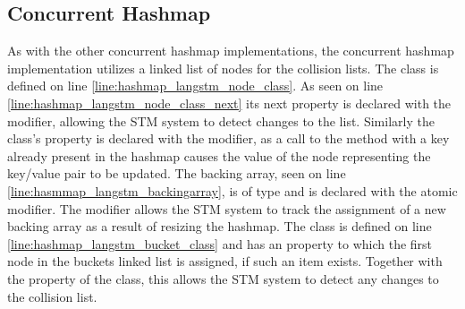 \subsection{Concurrent Hashmap}
As with the other concurrent hashmap implementations, the \stmname concurrent hashmap implementation utilizes a linked list of nodes for the collision lists. The  class is defined on line \ref{line:hashmap_langstm_node_class}. As seen on line \ref{line:hashmap_langstm_node_class_next} its next property is declared with the  modifier, allowing the \ac{STM} system to detect changes to the list. Similarly the  class's  property is declared with the  modifier, as a call to the  method with a key already present in the hashmap causes the value of the node representing the key/value pair to be updated. The backing array, seen on line \ref{line:hasmmap_langstm_backingarray}, is of type  and is declared with the atomic modifier. The  modifier allows the \ac{STM} system to track the assignment of a new backing array as a result of resizing the hashmap. The  class is defined on line \ref{line:hashmap_langstm_bucket_class} and has an  property to which the first node in the buckets linked list is assigned, if such an item exists. Together with the  property of the  class, this allows the \ac{STM} system to detect any changes to the collision list. 


